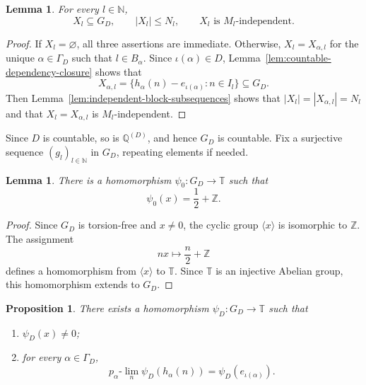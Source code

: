 \documentclass[11pt]{amsart}
\newtheorem{lemma}[theorem]{Lemma}
\newtheorem{proposition}[theorem]{Proposition}
\theoremstyle{definition}
\newcommand{\T}{\mathbb T}
\newcommand{\N}{\mathbb N}
\newcommand{\Z}{\mathbb Z}
\newcommand{\Q}{\mathbb Q}
\begin{document}
\begin{lemma}
\label{lem:local-stage-properties}
For every $l\in\N$,
\begin{equation}\label{eq:local-stage-properties}
 X_l\subseteq G_D,
 \qquad
 |X_l|\leq N_l,
 \qquad
 X_l\text{ is $M_l$-independent}.
\end{equation}
\end{lemma}

\begin{proof}
If $X_l=\varnothing$, all three assertions are immediate.  Otherwise,
$X_l=X_{\alpha,l}$ for the unique $\alpha\in\Gamma_D$ such that
$l\in B_\alpha$.  Since $\iota(\alpha)\in D$,
Lemma~\ref{lem:countable-dependency-closure}
shows that
\[
 X_{\alpha,l}
 =
 \{h_\alpha(n)-e_{\iota(\alpha)}:n\in I_l\}
 \subseteq G_D.
\]
Then Lemma~\ref{lem:independent-block-subsequences} shows that
$|X_l|=|X_{\alpha,l}|=N_l$ and that $X_l=X_{\alpha,l}$ is
$M_l$-independent.
\end{proof}

Since $D$ is countable, so is $\Q^{(D)}$, and hence $G_D$ is countable.  Fix
a surjective sequence $(g_l)_{l\in\N}$ in $G_D$, repeating elements if
needed.

\begin{lemma}
\label{lem:initial-homomorphism}
There is a homomorphism $\psi_0:G_D\to\T$ such that
\begin{equation}\label{eq:initial-homomorphism}
 \psi_0(x)=\frac12+\Z.
\end{equation}
\end{lemma}

\begin{proof}
Since $G_D$ is torsion-free and $x\neq0$, the cyclic group
$\langle x\rangle$ is isomorphic to $\Z$.  The assignment
\[
 nx\longmapsto \frac n2+\Z
\]
defines a homomorphism from $\langle x\rangle$ to $\T$.  Since $\T$ is an
injective Abelian group, this homomorphism extends to $G_D$.
\end{proof}

\begin{proposition}\label{prop:local-fusion}
There exists a homomorphism $\psi_D:G_D\to\T$ such that
\begin{enumerate}
\item $\psi_D(x)\neq0$;
\item for every $\alpha\in\Gamma_D$,
\begin{equation}\label{eq:local-admissibility}
 p_\alpha\text{-}\lim_n\psi_D(h_\alpha(n))
 =
 \psi_D(e_{\iota(\alpha)}).
\end{equation}
\end{enumerate}
\end{proposition}
\end{document}
